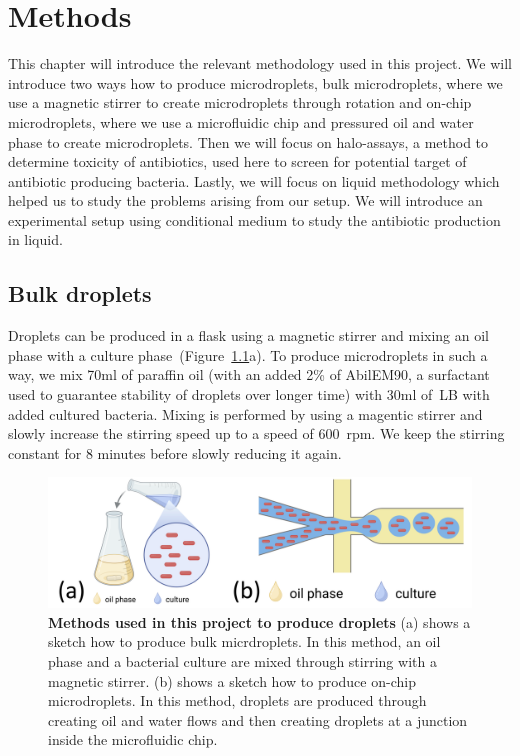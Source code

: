 \chapter{Methods}

This chapter will introduce the relevant methodology used in this project. We will introduce two ways how to produce microdroplets, bulk microdroplets, where we use a magnetic stirrer to create microdroplets through rotation and on-chip microdroplets, where we use a microfluidic chip and pressured oil and water phase to create microdroplets. Then we will focus on halo-assays, a method to determine toxicity of antibiotics, used here to screen for potential target of antibiotic producing bacteria. Lastly, we will focus on liquid methodology which helped us to study the problems arising from our setup. We will introduce an experimental setup using conditional medium to study the antibiotic production in liquid.

\section{Bulk droplets}
Droplets can be produced in a flask using a magnetic stirrer and mixing an oil phase with a culture phase~(Figure~\ref{fig:method_droplet_experiments}a). To produce microdroplets in such a way, we mix 70ml of paraffin oil (with an added 2\% of AbilEM90, a surfactant used to guarantee stability of droplets over longer time) with 30ml of~\gls{LB} with added cultured bacteria. Mixing is performed by using a magentic stirrer and slowly increase the stirring speed up to a speed of 600~\gls{rpm}. We keep the stirring constant for 8 minutes before slowly reducing it again. 
\begin{figure}
\centering
\includegraphics[width=\linewidth]{graphics/2025_09_30_droplets_fig2.png}
\caption{\textbf{Methods used in this project to produce droplets} (a) shows a sketch how to produce bulk micrdroplets. In this method, an oil phase and a bacterial culture are mixed through stirring with a magnetic stirrer. (b) shows a sketch how to produce on-chip microdroplets. In this method, droplets are produced through creating oil and water flows and then creating droplets at a junction inside the microfluidic chip.}
\label{fig:method_droplet_experiments}
\end{figure}

